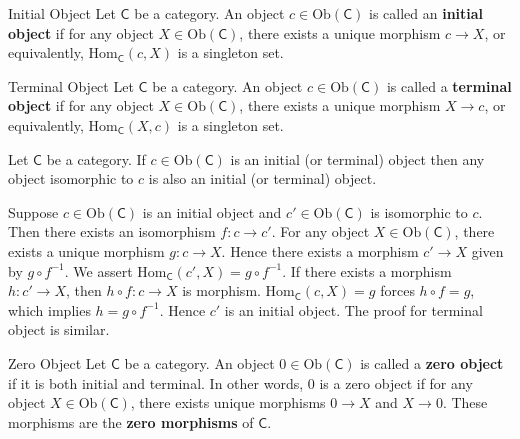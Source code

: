 \begin{definition}{Initial Object}{}
    Let $\mathsf{C}$ be a category. An object $c\in \mathrm{Ob}(\mathsf{C})$ is called an \textbf{initial object} if for any object $X\in \mathrm{Ob}(\mathsf{C})$, there exists a unique morphism $c\to X$, or equivalently, $\mathrm{Hom}_{\mathsf{C}}(c,X)$ is a singleton set. 
\end{definition}

\begin{definition}{Terminal Object}{}
    Let $\mathsf{C}$ be a category. An object $c\in \mathrm{Ob}(\mathsf{C})$ is called a \textbf{terminal object} if for any object $X\in \mathrm{Ob}(\mathsf{C})$, there exists a unique morphism $X\to c$, or equivalently, $\mathrm{Hom}_{\mathsf{C}}(X,c)$ is a singleton set.
\end{definition}

\begin{proposition}{}{}
    Let $\mathsf{C}$ be a category. If $c\in \mathrm{Ob}(\mathsf{C})$  is an initial (or terminal) object then any object isomorphic to $c$ is also an initial (or terminal) object.
\end{proposition}
\begin{prf}
    Suppose $c\in \mathrm{Ob}(\mathsf{C})$ is an initial object and $c'\in \mathrm{Ob}(\mathsf{C})$ is isomorphic to $c$. Then there exists an isomorphism $f:c\to c'$. For any object $X\in \mathrm{Ob}(\mathsf{C})$, there exists a unique morphism $g:c\to X$. Hence there exists a  morphism $c'\to X$ given by $g\circ f^{-1}$. We assert $\mathrm{Hom}_{\mathsf{C}}(c',X)=g\circ f^{-1}$. If there exists a morphism $h:c'\to X$, then $h\circ f:c\to X$ is morphism. $\mathrm{Hom}_{\mathsf{C}}(c,X)=g$ forces $h\circ f=g$, which implies $h=g\circ f^{-1}$. Hence $c'$ is an initial object. The proof for terminal object is similar.
\end{prf}


\begin{definition}{Zero Object}{}
    Let $\mathsf{C}$ be a category. An object $0\in \mathrm{Ob}(\mathsf{C})$ is called a \textbf{zero object} if it is both initial and terminal. In other words, $0$ is a zero object if for any object $X\in \mathrm{Ob}(\mathsf{C})$, there exists unique morphisms $0\to X$ and $X\to 0$. These morphisms are the \textbf{zero morphisms} of $\mathsf{C}$.
\end{definition}


